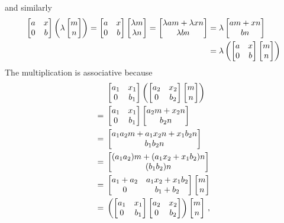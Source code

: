 and similarly
\begin{align*}
  \begin{bmatrix}
    a & x \\
    0 & b
  \end{bmatrix}
  \left(
    \lambda
    \begin{bmatrix} m \\ n \end{bmatrix}
  \right)
  =
  \begin{bmatrix}
    a & x \\
    0 & b
  \end{bmatrix}
  \begin{bmatrix} \lambda m \\ \lambda n \end{bmatrix}
  =
  \begin{bmatrix}  \lambda am + \lambda xn \\ \lambda bn  \end{bmatrix}
  &=
  \lambda 
  \begin{bmatrix} am + xn \\ bn \end{bmatrix}
  \\
  &=
  \lambda
  \left(
    \begin{bmatrix}
      a & x \\
      0 & b
    \end{bmatrix}
    \begin{bmatrix} m \\ n \end{bmatrix}
  \right)
\end{align*}
The multiplication is associative because
\begin{align*}
  {}&
  \begin{bmatrix}
    a_1 & x_1 \\
    0   & b_1
  \end{bmatrix}
  \left(
    \begin{bmatrix}
      a_2 & x_2 \\
      0   & b_2
    \end{bmatrix}
    \begin{bmatrix} m \\ n \end{bmatrix}
  \right)
  \\
  ={}&
  \begin{bmatrix}
    a_1 & x_1 \\
    0   & b_1
  \end{bmatrix}
  \begin{bmatrix}  a_2 m + x_2 n \\ b_2 n  \end{bmatrix}
  \\
  ={}&
  \begin{bmatrix}  a_1 a_2 m + a_1 x_2 n + x_1 b_2 n \\ b_1 b_2 n  \end{bmatrix}
  \\
  ={}&
  \begin{bmatrix}  (a_1 a_2) m + (a_1 x_2 + x_1 b_2) n \\ (b_1 b_2) n  \end{bmatrix}
  \\
  ={}&
  \begin{bmatrix}
    a_1 + a_2 & a_1 x_2 + x_1 b_2 \\
    0         & b_1 + b_2
  \end{bmatrix}
  \begin{bmatrix} m \\ n \end{bmatrix}
  \\
  ={}&
  \left(
    \begin{bmatrix}
      a_1 & x_1 \\
      0   & b_1
    \end{bmatrix}
    \begin{bmatrix}
      a_2 & x_2 \\
      0   & b_2
    \end{bmatrix}
  \right)
  \begin{bmatrix} m \\ n \end{bmatrix} \,,
\end{align*}
